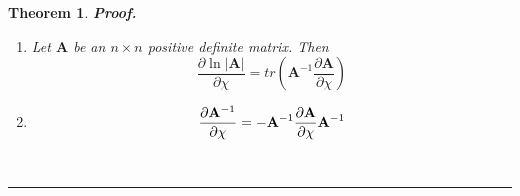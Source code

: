 \documentclass{article}
\newtheorem{theorem}{Theorem}
\newenvironment{proof}[1][Proof]{\noindent\textbf{#1.} }{\ \rule{0.5em}{0.5em}}
\begin{document}
\begin{theorem}
\begin{proof}
\begin{enumerate}
\item Let $\mathbf{A}$ be an $n\times n$ positive definite matrix. Then%
\begin{equation*}
\frac{\partial \ln \left\vert \mathbf{A}\right\vert }{\partial \chi }%
=tr\left( \mathbf{A}^{-1}\frac{\partial \mathbf{A}}{\partial \chi }\right) 
\end{equation*}

\item 
\begin{equation*}
\frac{\partial \mathbf{A}^{-1}}{\partial \chi }=-\mathbf{A}^{-1}\frac{%
\partial \mathbf{A}}{\partial \chi }\mathbf{A}^{-1}
\end{equation*}
\end{enumerate}
\end{proof}
\end{theorem}
\end{document}
